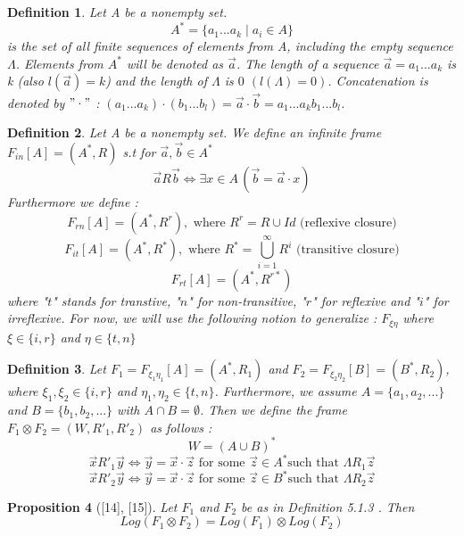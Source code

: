 \documentclass[12pt, a4paper]{scrartcl}
\newtheorem{definition}{Definition}[subsection]
\newtheorem{proposition}[definition]{Proposition}
\begin{document}
\begin{definition}
    Let A be a nonempty set.
    $$A^* = \{a_1...a_k \mid a_i \in A\}$$ 
    is the set of all finite sequences of elements from A, including the empty sequence $\Lambda$.
    Elements from $A^*$ will be denoted as $\vec{a}$. The length of a sequence $\vec{a} = a_1...a_k$ is k (also $l(\vec{a}) = k$) 
    and the length of $\Lambda$ is $0$ $(l(\Lambda) = 0)$. Concatenation is denoted by $"\cdot"$ : $(a_1...a_k) \cdot (b_1...b_l) = \vec{a} \cdot \vec{b} = a_1...a_kb_1...b_l$.

\end{definition}

\begin{definition}
    Let A be a nonempty set. We define an infinite frame $F_{in}[A] = (A^*, R)$ s.t for $\vec{a}, \vec{b} \in A^*$ 
    $$\vec{a}R\vec{b} \Leftrightarrow \exists x \in A \, (\vec{b} = \vec{a} \cdot x)$$
    Furthermore we define : 
    $$F_{rn}[A] = (A^*,R^r), \mbox{ where } R^r = R \cup Id \mbox{ (reflexive closure)}$$
    $$F_{it}[A] = (A^*,R^*), \mbox{ where } R^* = \bigcup_{i=1}^{\infty}R^i \mbox{ (transitive closure)}$$
    $$F_{rt}[A] = (A^*, R^{r*})$$ \newline
    where "$t$" stands for transtive, "$n$" for non-transitive, "$r$" for reflexive and "$i$" for irreflexive. \newline
    For now, we will use the following notion to generalize : $F_{\xi \eta}$ where $\xi \in \{i,r\}$ and $\eta \in \{t,n\}$ \newline
\end{definition}

\begin{definition}
    Let $F_1 = F_{\xi_1 \eta_1}[A] = (A^*,R_1)$ and $F_2 = F_{\xi_2 \eta_2}[B] = (B^*,R_2)$, where $\xi_1, \xi_2 \in \{i,r\}$ 
    and $\eta_1, \eta_2 \in \{t,n\}$. Furthermore, we assume $A = \{a_1, a_2,...\}$ and $B = \{b_1,b_2,...\}$ with $A \cap B = \emptyset$. Then we define the frame $F_1 \otimes F_2 = (W, R'_1, R'_2)$ as follows :
    $$W = (A \cup B)^*$$
    $$\vec{x} R'_1 \vec{y} \Leftrightarrow \vec{y} = \vec{x} \cdot \vec{z} \mbox{ for some } \vec{z} \in A^* \mbox{such that }\Lambda R_1 \vec{z}$$
    $$\vec{x} R'_2 \vec{y} \Leftrightarrow \vec{y} = \vec{x} \cdot \vec{z} \mbox{ for some } \vec{z} \in B^* \mbox{such that }\Lambda R_2 \vec{z}$$ \newline
\end{definition}

\begin{proposition} [\textnormal{[14], [15]}]
    Let $F_1$ and $F_2$ be as in Definition 5.1.3 . Then 
    $$Log(F_1 \otimes F_2) = Log(F_1) \otimes Log(F_2)$$
\end{proposition}
\end{document}

